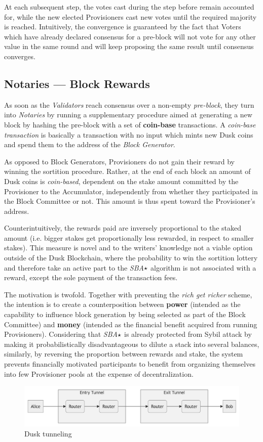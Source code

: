 At each subsequent step, the votes cast during the step before remain
accounted for, while the new elected Provisioners cast new votes until
the required majority is reached. Intuitively, the convergence is
guaranteed by the fact that Voters which have already declared consensus
for a pre-block will not vote for any other value in the same round and
will keep proposing the same result until consensus converges.

\subsection{Notaries --- Block Rewards}
\label{sec:Block-Reward}

As soon as the \emph{Validators} reach consensus over a non-empty
\emph{pre-block}, they turn into \emph{Notaries} by running a
supplementary procedure aimed at generating a new block by hashing the
pre-block with a set of \textbf{coin-base} transactions. A
\emph{coin-base transaction} is basically a transaction with no input
which mints new \textrm{Dusk} coins and spend them to the address of the
\emph{Block Generator}.

As opposed to Block Generators, Provisioners do not gain their reward by
winning the sortition procedure. Rather, at the end of each block an
amount of \textrm{Dusk} coins is \emph{coin-based}, dependent on the stake
amount committed by the Provisioner to the Accumulator, independently
from whether they participated in the Block Committee or not. This
amount is thus spent toward the Provisioner's address.

Counterintuitively, the rewards paid are inversely proportional to the
staked amount (i.e. bigger stakes get proportionally less rewarded, in
respect to smaller stakes). This measure is novel and to the writers'
knowledge not a viable option outside of the \textrm{Dusk} Blockchain, where the
probability to win the sortition lottery and therefore take an active
part to the \emph{SBA}\(\large\star\) algorithm is not associated with a
reward, except the sole payment of the transaction fees.

The motivation
is twofold. Together with preventing the \emph{rich get richer} scheme,
the intention is to create a counterposition between \textbf{power}
(intended as the capability to influence block generation by being
selected as part of the Block Committee) and \textbf{money} (intended as
the financial benefit acquired from running Provisioners). Considering
that \emph{SBA}\(\large\star\) is already protected from Sybil attack by
making it probabilistically disadvantageous to dilute a stack into
several balances, similarly, by reversing the proportion between rewards
and stake, the system prevents financially motivated participants to
benefit from organizing themselves into few Provisioner pools at the
expense of decentralization.

\begin{figure}
\includegraphics[scale=0.18]{tunnels}
\caption{\textrm{Dusk} tunneling}
\label{tunn}
\end{figure}